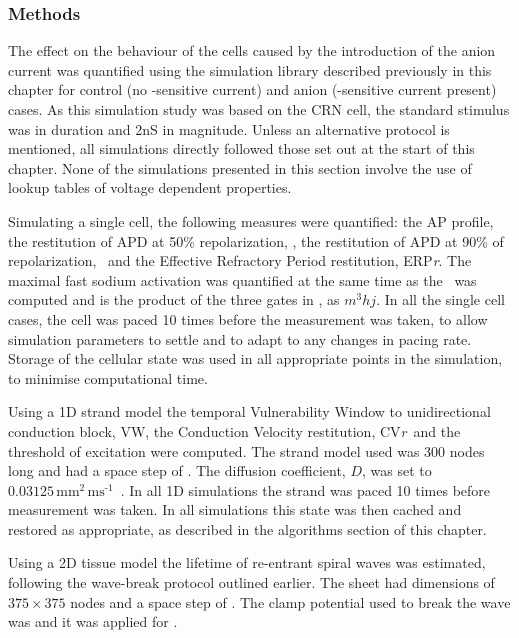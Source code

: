 \subsubsection{Methods}

The effect on the behaviour of the cells caused by the introduction of the anion
current was quantified using the simulation library described previously in this
chapter for control (no \nothree-sensitive  current) and anion
(\nothree-sensitive  current present) cases.  As this simulation study
was based on the CRN cell, the standard stimulus was  in duration and
\unit{2}{nS} in magnitude.  Unless an alternative protocol is mentioned, all
simulations directly followed those set out at the start of this chapter.  None
of the simulations presented in this section involve the use of lookup tables of
voltage dependent properties.

Simulating a single cell, the following measures were quantified: the AP
profile, the restitution of APD at 50\% repolarization, \apdr[50], the
restitution of APD at 90\% of repolarization, \apdr\ and the Effective
Refractory Period restitution, ERP\emph{r}.  The maximal fast sodium activation
was quantified at the same time as the \apdr\ was computed and is the product of
the three gates in , as $m^{3}hj$. In all the single cell cases, the
cell was paced 10 times before the measurement was taken, to allow simulation
parameters to settle and to adapt to any changes in pacing rate.  Storage of the
cellular state was used in all appropriate points in the simulation, to minimise
computational time.

Using a 1D strand model the temporal Vulnerability Window to unidirectional
conduction block, VW, the Conduction Velocity restitution, CV\emph{r}\ and the
threshold of excitation were computed.  The strand model used was 300 nodes long
and had a space step of .  The diffusion coefficient, $D$, was set to
$0.03125\,\text{mm}^{\text{2}}\,\text{ms}^{\text{-1}}$~\cite{Biktasheva2005}.
In all 1D simulations the strand was paced 10 times before measurement was
taken.  In all simulations this state was then cached and restored as
appropriate, as described in the algorithms section of this chapter.

Using a 2D tissue model the lifetime of re-entrant spiral waves was estimated,
following the wave-break protocol outlined earlier.  The sheet had dimensions of
$375\times375$ nodes and a space step of .  The clamp potential used
to break the wave was  and it was applied for .


